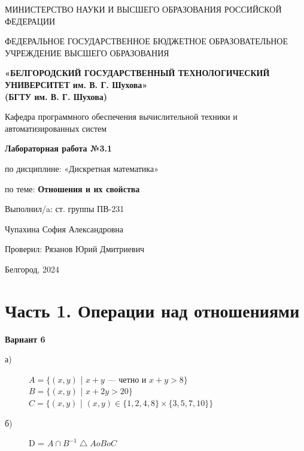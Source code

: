 \documentclass[12pt]{article}
\begin{document}
	\begin{center}
		{\parskip=1cm
			МИНИСТЕРСТВО НАУКИ И ВЫСШЕГО ОБРАЗОВАНИЯ РОССИЙСКОЙ ФЕДЕРАЦИИ
			
			ФЕДЕРАЛЬНОЕ ГОСУДАРСТВЕННОЕ БЮДЖЕТНОЕ ОБРАЗОВАТЕЛЬНОЕ УЧРЕЖДЕНИЕ ВЫСШЕГО ОБРАЗОВАНИЯ
			
			{\bf«БЕЛГОРОДСКИЙ ГОСУДАРСТВЕННЫЙ ТЕХНОЛОГИЧЕСКИЙ УНИВЕРСИТЕТ им. В. Г. Шухова»\\(БГТУ им. В. Г. Шухова)}
			
			\begin{figure}[bh]
				\noindent{}
			\end{figure}
			Кафедра программного обеспечения вычислительной техники и автоматизированных систем
		}
		
		{\Large 
			\vspace{1cm}
			{\parskip=0.25cm 
				{\bf Лабораторная работа №3.1}
				
				по дисциплине: «Дискретная математика»

				по теме: {\bf Отношения и их свойства}
			}
		}
	\end{center}	
	\begin{flushleft}
		{\leftskip=10cm
			{\vspace{3cm} Выполнил/a: ст. группы ПВ-231}
			
			Чупахина София Александровна
			
			Проверил: Рязанов Юрий Дмитриевич
			
		}
	\end{flushleft}
	\begin{center}
		{\parskip=3cm Белгород, 2024}
	\end{center}
	\newpage
	
	\tableofcontents
	\newpage
	
	\section{Часть 1. Операции над отношениями}
	\label{startpart1}
	{\bf Вариант 6} 
	\begin{description}
		\item[а)] $A = \{(x, y)$ | $x + y$ --- четно и $x + y > 8\}$ \\
		$B = \{(x, y)$ | $x + 2y > 20\}$ \\
		$C = \{(x, y)$ | $(x, y) \in \{1, 2, 4, 8\} \times \{3, 5, 7, 10\} \}$
		\item[б)] D = $A \cap B^{-1} \bigtriangleup A o B o C$
	\end{description}
\end{document}
